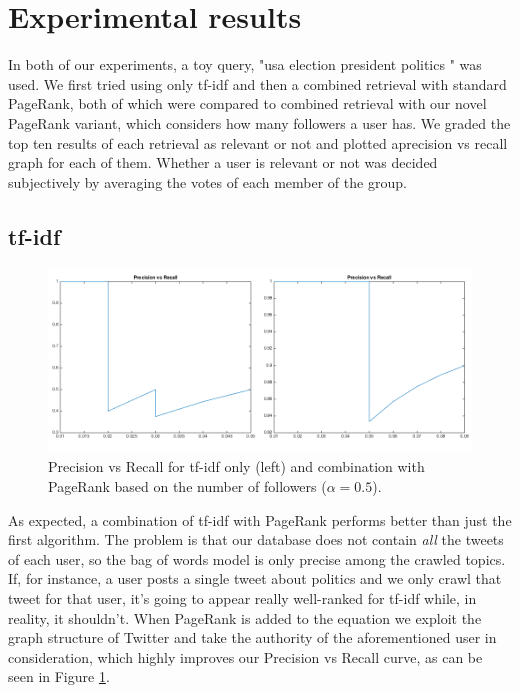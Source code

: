 \section{Experimental results}

In both of our experiments, a toy query, "usa election president politics " was
used. We first tried using only tf-idf and then a combined retrieval with
standard PageRank, both of which were compared to combined retrieval with our
novel PageRank variant, which considers how many followers a user has. We graded
the top ten results of each retrieval as relevant or not and plotted aprecision
vs recall graph for each of them.  Whether a user is relevant or not was decided
subjectively by averaging the votes of each member of the group.

\subsection{tf-idf}

\begin{figure}[H]
\centering
\includegraphics[width=5.5in,natwidth=534,natheight=345]{images/exptfidf.png}
\caption{Precision vs Recall for tf-idf only (left) and combination with PageRank based on the number of followers ($\alpha = 0.5$).}
\label{fig:exptfidf}
\end{figure}

As expected, a combination of tf-idf with PageRank performs better than just the
first algorithm.  The problem is that our database does not contain \emph{all}
the tweets of each user, so the bag of words model is only precise among the
crawled topics. If, for instance, a user posts a single tweet about politics and
we only crawl that tweet for that user, it's going to appear really well-ranked
for tf-idf while, in reality, it shouldn't. When PageRank is added to the
equation we exploit the graph structure of Twitter and take the authority of the
aforementioned user in consideration, which highly improves our Precision vs
Recall curve, as can be seen in Figure \ref{fig:exptfidf}.

